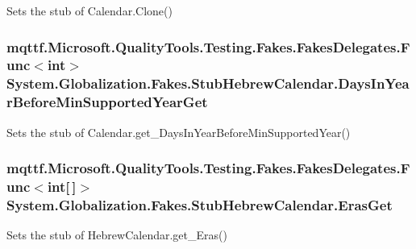 Sets the stub of Calendar.\-Clone()

\hypertarget{class_system_1_1_globalization_1_1_fakes_1_1_stub_hebrew_calendar_ae33fad6f6c33f2ddb833db9acc478ea7}{
\subsubsection[{Days\-In\-Year\-Before\-Min\-Supported\-Year\-Get}]{\setlength{\rightskip}{0pt plus 5cm}mqttf.\-Microsoft.\-Quality\-Tools.\-Testing.\-Fakes.\-Fakes\-Delegates.\-Func$<$int$>$ System.\-Globalization.\-Fakes.\-Stub\-Hebrew\-Calendar.\-Days\-In\-Year\-Before\-Min\-Supported\-Year\-Get}}\label{class_system_1_1_globalization_1_1_fakes_1_1_stub_hebrew_calendar_ae33fad6f6c33f2ddb833db9acc478ea7}


Sets the stub of Calendar.\-get\-\_\-\-Days\-In\-Year\-Before\-Min\-Supported\-Year()

\hypertarget{class_system_1_1_globalization_1_1_fakes_1_1_stub_hebrew_calendar_a4b165255eb1896dc0346658536cb4fc0}{
\subsubsection[{Eras\-Get}]{\setlength{\rightskip}{0pt plus 5cm}mqttf.\-Microsoft.\-Quality\-Tools.\-Testing.\-Fakes.\-Fakes\-Delegates.\-Func$<$int\mbox{[}$\,$\mbox{]}$>$ System.\-Globalization.\-Fakes.\-Stub\-Hebrew\-Calendar.\-Eras\-Get}}\label{class_system_1_1_globalization_1_1_fakes_1_1_stub_hebrew_calendar_a4b165255eb1896dc0346658536cb4fc0}


Sets the stub of Hebrew\-Calendar.\-get\-\_\-\-Eras()

